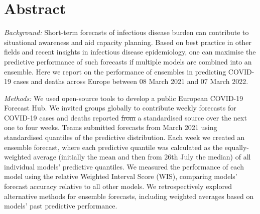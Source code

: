 \documentclass[
]{article}
\providecommand{\DIFaddtex}[1]{{\protect\color{blue}\uwave{#1}}} %
\providecommand{\DIFdeltex}[1]{{\protect\color{red}\sout{#1}}}                      %
\providecommand{\DIFaddbegin}{} %
\providecommand{\DIFaddend}{} %
\providecommand{\DIFdelbegin}{} %
\providecommand{\DIFdelend}{} %
\providecommand{\DIFadd}[1]{\texorpdfstring{\DIFaddtex{#1}}{#1}} %
\providecommand{\DIFdel}[1]{\texorpdfstring{\DIFdeltex{#1}}{}} %
\newcommand{\DIFscaledelfig}{0.5}
\newlength{\DIFdelgraphicswidth} %
\newlength{\DIFdelgraphicsheight} %
\newcommand{\DIFaddincludegraphics}[2][]{{\color{blue}\fbox{\DIFOincludegraphics[#1]{#2}}}} %
\newcommand{\DIFdelincludegraphics}[2][]{%
\sbox{\DIFdelgraphicsbox}{\DIFOincludegraphics[#1]{#2}}%
\settoboxwidth{\DIFdelgraphicswidth}{\DIFdelgraphicsbox} %
\settoboxtotalheight{\DIFdelgraphicsheight}{\DIFdelgraphicsbox} %
\scalebox{\DIFscaledelfig}{%
\parbox[b]{\DIFdelgraphicswidth}{\usebox{\DIFdelgraphicsbox}\\[-\baselineskip] \rule{\DIFdelgraphicswidth}{0em}}\llap{\resizebox{\DIFdelgraphicswidth}{\DIFdelgraphicsheight}{%
\setlength{\unitlength}{\DIFdelgraphicswidth}%
\begin{picture}(1,1)%
\thicklines\linethickness{2pt} %
{\color[rgb]{1,0,0}\put(0,0){\framebox(1,1){}}}%
{\color[rgb]{1,0,0}\put(0,0){\line( 1,1){1}}}%
{\color[rgb]{1,0,0}\put(0,1){\line(1,-1){1}}}%
\end{picture}%
}\hspace*{3pt}}} %
} %
\DeclareRobustCommand{\DIFaddbegin}{\DIFOaddbegin \let\includegraphics\DIFaddincludegraphics} %
\DeclareRobustCommand{\DIFaddend}{\DIFOaddend \let\includegraphics\DIFOincludegraphics} %
\DeclareRobustCommand{\DIFdelbegin}{\DIFOdelbegin \let\includegraphics\DIFdelincludegraphics} %
\DeclareRobustCommand{\DIFdelend}{\DIFOaddend \let\includegraphics\DIFOincludegraphics} %
\begin{document}
\hypertarget{abstract}{%
\section{Abstract}\label{abstract}}

\emph{Background:} Short-term forecasts of infectious disease burden can contribute to situational awareness and aid capacity planning. Based on best practice in other fields and recent insights in infectious disease epidemiology, one can maximise the predictive performance of such forecasts if multiple models are combined into an ensemble. Here we report on the performance of ensembles in predicting COVID-19 cases and deaths across Europe between 08 March 2021 and 07 March 2022.

\emph{Methods:} We used open-source tools to develop a public European COVID-19 Forecast Hub. We invited groups globally to contribute weekly forecasts for COVID-19 cases and deaths reported \DIFdelbegin \DIFdel{from }\DIFdelend \DIFaddbegin \DIFadd{by }\DIFaddend a standardised source \DIFaddbegin \DIFadd{for 32 countries }\DIFaddend over the next one to four weeks. Teams submitted forecasts from March 2021 using standardised quantiles of the predictive distribution. Each week we created an ensemble forecast, where each predictive quantile was calculated as the equally-weighted average (initially the mean and then from 26th July the median) of all individual models' predictive quantiles. We measured the performance of each model using the relative Weighted Interval Score (WIS), comparing models' forecast accuracy relative to all other models. We retrospectively explored alternative methods for ensemble forecasts, including weighted averages based on models' past predictive performance.
\end{document}

